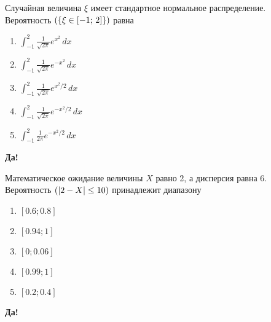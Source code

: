 \documentclass[t]{beamer}
\let\P\relax
\DeclareMathOperator{\P}{\mathbb{P}}
\begin{document}
 \begin{frame} \label{32-Yes} 
\begin{block}{32} 

Случайная величина $\xi$ имеет стандартное нормальное распределение. Вероятность $\P(\{\xi \in [-1; \, 2]\})$ равна


 \end{block} 
\begin{enumerate} 
\item[] \hyperlink{32-No}{\beamergotobutton{}  $\int_{-1}^{2}\tfrac{1}{\sqrt{2\pi}}e^{x^2}\,dx$ }
\item[] \hyperlink{32-No}{\beamergotobutton{}  $\int_{-1}^{2}\tfrac{1}{\sqrt{2\pi}}e^{-x^2}\,dx$}
\item[] \hyperlink{32-No}{\beamergotobutton{}  $\int_{-1}^{2}\tfrac{1}{\sqrt{2\pi}}e^{x^2 / 2}\,dx$}
\item[] \hyperlink{32-Yes}{\beamergotobutton{}  $\int_{-1}^{2}\tfrac{1}{\sqrt{2\pi}}e^{-x^2 / 2}\,dx$}
\item[] \hyperlink{32-No}{\beamergotobutton{}  $\int_{-1}^{2}\tfrac{1}{2\pi}e^{-x^2 / 2}\,dx$}
\end{enumerate} 

 \textbf{Да!} 
 \hyperlink{33}{}\end{frame} 


 \begin{frame} \label{33-Yes} 
\begin{block}{33} 

Математическое ожидание величины $X$ равно 2, а дисперсия равна 6. Вероятность $\P(|2-X|\leq 10)$ принадлежит диапазону
  


 \end{block} 
\begin{enumerate} 
\item[] \hyperlink{33-No}{\beamergotobutton{} $[0.6; 0.8]$}
\item[] \hyperlink{33-Yes}{\beamergotobutton{} $[0.94; 1]$}
\item[] \hyperlink{33-No}{\beamergotobutton{} $[0; 0.06]$}
\item[] \hyperlink{33-No}{\beamergotobutton{} $[0.99;1]$}
\item[] \hyperlink{33-No}{\beamergotobutton{} $[0.2;0.4]$}
\end{enumerate} 

 \textbf{Да!} 
 \hyperlink{34}{}\end{frame} 
\end{document}
